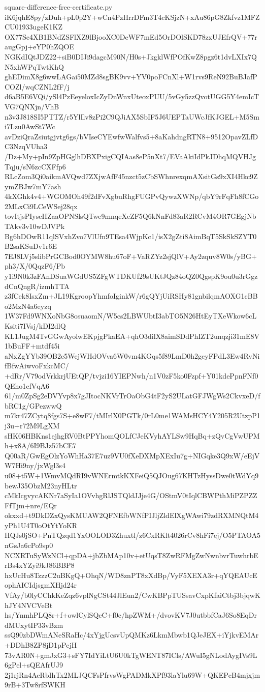 \documentclass[11pt]{article}
\theoremstyle{definition}
\theoremstyle{remark}
\begin{document}
\begin{filecontents*}[overwrite]{square-difference-free-certificate.py}
iK6jqhE8py/zDuh+pL0p2Y+wCn4PzHrrDFm3T4cKSjzN+xAu86pG8Zkfvz1MFZCU01933ugeK1KZ
OX77Sc4XB1BNdZSFlXZ9lBjooXC0DeWF7mEd5OrDOlSKD78zxUJEfrQV+77raugGpj+eYP0hZQOE
NGKdIQtJDZ22+siB0DIJi9dagcM90N/H0s+JkgklWfPOfKwZ8pgz6t1dvLXIx7QN5xhWPqTwtKhQ
ghEDimX8g6wwLAGai50MZd8sgBK9vv+YV0poFCnXl+W1rvs9ReN92BuBJafPCOZl/wqCZNL2fF/j
d6aB5E6VQi/ySl4PzEeyeloxIcZyDnWnxUteoxPUU/5vGy5zzQvotUGG5Y4emIcTVG7QNXjn/VhB
n3v3J818SI5PTTZ/r5YlIlv8zPi2C9QJiAX5SbIF5J6UEPTaUWcJfKJGEL+M5Smi7Lzu0AwSt7Wc
avDziQraZsiutgjvtg6gs/bVIseCYEwfwWalfvs5+8aKahdngRTN8+9512OpavZLfDC3NzqVUha3
/Dz+My+pIn9ZpHGglhDBXPxigCQIAas8eP5nXt7/EVaAkiIdPkJDhqMQVHJgTqju/sN6zcCXFfp6
RLcZom3Qi0aikmAVQwd7ZXjwAfF45nzct5zCbSWhnrexqmAXsitGs9xXI4Hkc9ZymZBJw7mY7ash
4kXGhk4v4+WGOMOh49f2dFvXgbuRhgFUGPvQywzXWNp/qbY9rFqFh8fCGo2MLxCi9LCeWSej28qx
tovItjsPIyseHZaaOPNSlsQTwe9mnqeXeZF5Q6kNnFd83aR2RCvM4OR7GEgjNbTAkv3v10wDJVPk
Bg6hDOwR11qlSVxhZvo7VlUfn9TEsa4WjpKc1/isX2gZti8AimBqT5SkSkSZYT0B2saKSuDv1r6E
7EJ8LVj5slibPrGCBod0OYMW8hu67oF+VaRZYz2sjQlV+Ay2zquv8W0s/yBG+ph3/X/0QqzF6/Pb
y1i9N0k3zFAnDSuaWGdUS5ZFgWTDKUf29sUKtJQz84oQZ0QgspK9ou0u3rGgzdCnQngR/izmhTTA
z3fCek8IsxZm+JL19KgroopYhmfoIginkW/r6gQYjUiRSHy81gnbilqmAOXG1cBBo2MzN4a6eyzq
1W37Fd9WNXoNbG8osuaomN/W5cs2LBWUbtI3abTO5N26HtEyTXeWkow6cLKsiti7IVsj/kDI2dlQ
KL1JugM4TvGGwAyolwEKpjgPkaEA+qhO3dilX8aimSDdPhIZT2unqzji31mE8V1bBuFF+mtdf45i
aNxZgYYb39OB2e5WejWHdOVva6W0vm4KGqs5f89LmD0h2gcyFPdL3Ew4RvNifBfwAiwvoFxkcMC/
+dRr/V79odVrkkrjUEtQP/tvjzi16YIEPNwh/n1V0zF5ko0Fzpf+Y01kdePpnFNf0QEho1cfVqA6
61/m0ZpSg2eDVYvp8x7gJItocNKVrTrOaObG4tF2yS2ULatGFJWgWs2CkvxeD/fbRC1g/GPezwwQ
m7kr47ZCytq8fgs7S+e8wF7/tMIrlX0PGTk/0rL0me1WAMsHCY4Y205R2UtzpP1j3u+r72M9LgXM
sHK06HBKns1ejhgRV0BtPPYhomQOLfCJeKVyhAYLSw9HqBq+zQvCgVwUPMh+x8A/6I9BJz57bCE7
Q00aR/GwEgOlzYoWhHa37E7uz9VU0fXeDXMpXExIu7g+NIGqke3Q9xW/eEjVW7Hi9ny/jxWgl3s4
u08+t5W+1WmvMQdRI9vWNErmtkKXFeiQ5QJOug67KHTzHyssDwe0tWdYq9bewJ35ObzM23nyHLtr
cMkIcgvycAKNr7aSyIa1OVvhgRlJSTQldJJje4G/OStmV0tIqlCBWPthMiPZPZZFfTjm+nre/EQr
okxxd+t9DkDZxQysKMUAW2QFNEfbWNfPIJljZldElXgWAwi79zdRXMNQtM4yPh1U4T0oOtYtYoKR
HQJs0jSO+PnTQzqd1YxOOLOD3Zhuxtl/z6CxRKlt4026rCv8hFi7ej/O5PTAOA5nGsJa6cPo9sp0
NCXRTuSyWzNCl+qpDA+jbZbMAp10v+etUqsT8ZwRFMgZwNwnbvrTuwhrbErBs4xYZyi9kJ86BBP8
hxUcHu8TzzzC2uBKgQ+OhqN/WD8znPT8xXdBp/VyF5XEXA3r+qYQEAUcEophAICIdjsgmXHjd24r
VfAy/b0lyCChkKeZqz6vplNgCSt44JlEun2/CwKBPpTUSsavCxpKfaiCtbj3bjqwKhJY4NVCVeBt
hs/YnmhPLQ8r+f+owlCylSQcC+f0c/hpZWM+/dvovKV7J0utbbfCaJ6So8EqDrdMUxytIP33vBzm
ssQ90zbDWmANeSRaHc/4xYjgUcsvUpQMKz6LkmMbwb1QJeJEX+iYjkvEMAr+DDhB8ZP8jD1pPcjH
73vAR0N+gmJxG3+sFY7IdYiLtU6U0kTgWENT87ICls/AWuI5gNLodAygIVs9L6gPel+sQEAfrUJ9
2j1rjRn4AcRbIhTx2MLJQCFsPfrvsWgPADMkXPf93laYlu69W+QKEPcB4mjxjm9rB+3Tw8rfSWKH

\end{filecontents*}
\end{document}
